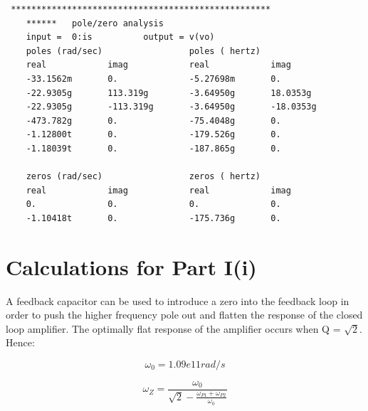 \documentclass[12pt,a4paper]{article}
\begin{document}
\begin{verbatim}
 ***************************************************
    ******   pole/zero analysis
    input =  0:is          output = v(vo)
    poles (rad/sec)                 poles ( hertz)
    real            imag            real            imag
    -33.1562m       0.              -5.27698m       0.
    -22.9305g       113.319g        -3.64950g       18.0353g
    -22.9305g       -113.319g       -3.64950g       -18.0353g
    -473.782g       0.              -75.4048g       0.
    -1.12800t       0.              -179.526g       0.
    -1.18039t       0.              -187.865g       0.

    zeros (rad/sec)                 zeros ( hertz)
    real            imag            real            imag
    0.              0.              0.              0.
    -1.10418t       0.              -175.736g       0.

\end{verbatim}

\pagebreak


\section{Calculations for Part I(i)}



A feedback capacitor can be used to introduce a zero into the feedback loop in
order to push the higher frequency pole out and flatten the response of the
closed loop amplifier. The optimally flat response of the amplifier occurs when Q = $\sqrt{2}$. Hence:

\begin{equation}
  \omega_0 = 1.09e11 rad/s
\end{equation}

\begin{equation}
  \omega_Z = \frac{\omega_{0}}{\sqrt{2} - \frac{\omega_{P1} + \omega_{P2}}{\omega_{0}}}
\end{equation}
\end{document}
